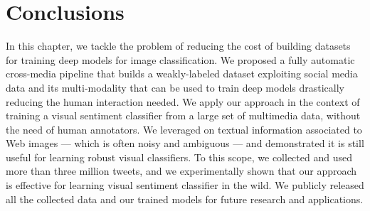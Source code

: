 
\section{Conclusions}
\label{sec:vsa:conclusion}

In this chapter, we tackle the problem of reducing the cost of building datasets for training deep models for image classification.
We proposed a fully automatic cross-media pipeline that builds a weakly-labeled dataset exploiting social media data and its multi-modality that can be used to train deep models drastically reducing the human interaction needed.
We apply our approach in the context of training a visual sentiment classifier from a large set of multimedia data, without the need of human annotators.
We leveraged on textual information associated to Web images --- which is often noisy and ambiguous --- and demonstrated it is still useful for learning robust visual classifiers.
To this scope, we collected and used more than three million tweets, and we experimentally shown that our approach is effective for learning visual sentiment classifier in the wild.
We publicly released all the collected data and our trained models for future research and applications.